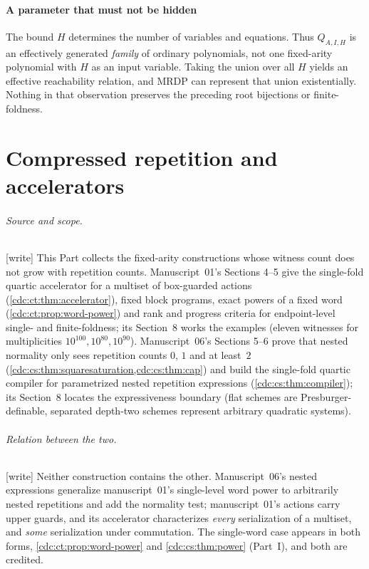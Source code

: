 \documentclass[11pt,a4paper]{article}
\theoremstyle{definition}
\theoremstyle{remark}
\newcommand{\wtag}{\textup{[write]}}%
\begin{document}
\subsection{A parameter that must not be hidden}
The bound $H$ determines the number of variables and equations. Thus
$Q_{A,I,H}$ is an effectively generated \emph{family} of ordinary polynomials, not one fixed-arity polynomial with $H$ as an input variable. Taking the union over all $H$ yields an effective reachability relation, and MRDP can represent that union existentially. Nothing in that observation preserves the preceding root bijections or finite-foldness.


\part{Compressed repetition and accelerators}\label{cdc:part:accel}

\paragraph{Source and scope.} \wtag{} This Part collects the fixed-arity constructions whose witness count does not grow with repetition counts. Manuscript~01's Sections 4--5 give the single-fold quartic accelerator for a multiset of box-guarded actions (\cref{cdc:ct:thm:accelerator}), fixed block programs, exact powers of a fixed word (\cref{cdc:ct:prop:word-power}) and rank and progress criteria for endpoint-level single- and finite-foldness; its Section~8 works the examples (eleven witnesses for multiplicities $10^{100},10^{80},10^{90}$). Manuscript~06's Sections 5--6 prove that nested normality only sees repetition counts $0$, $1$ and at least~$2$ (\cref{cdc:cs:thm:squaresaturation,cdc:cs:thm:cap}) and build the single-fold quartic compiler for parametrized nested repetition expressions (\cref{cdc:cs:thm:compiler}); its Section~8 locates the expressiveness boundary (flat schemes are Presburger-definable, separated depth-two schemes represent arbitrary quadratic systems).

\paragraph{Relation between the two.} \wtag{} Neither construction contains the other. Manuscript~06's nested expressions generalize manuscript~01's single-level word power to arbitrarily nested repetitions and add the normality test; manuscript~01's actions carry upper guards, and its accelerator characterizes \emph{every} serialization of a multiset, and \emph{some} serialization under commutation. The single-word case appears in both forms, \cref{cdc:ct:prop:word-power} and \cref{cdc:cs:thm:power} (Part~I), and both are credited.
\end{document}
